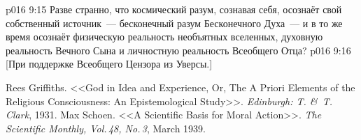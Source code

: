 \vs p016 9:15 Разве странно, что космический разум, сознавая себя, осознаёт свой собственный источник~--- бесконечный разум Бесконечного Духа~--- и в то же время осознаёт физическую реальность необъятных вселенных, духовную реальность Вечного Сына и личностную реальность Всеобщего Отца?
\vsetoff
\vs p016 9:16 [При поддержке Всеобщего Цензора из Уверсы.]
\quizlink
\begin{thebibliography}{100}
Rees Griffiths.
{<<God in Idea and Experience, Or, The A Priori Elements of the Religious Consciousness: An Epistemological Study>>.}
{\em Edinburgh: T. \&\ T. Clark}, 1931.
Max Schoen.
{<<A Scientific Basis for Moral Action>>.}
{\em The Scientific Monthly, Vol.\,48, No.\,3}, March 1939.
\end{thebibliography}
